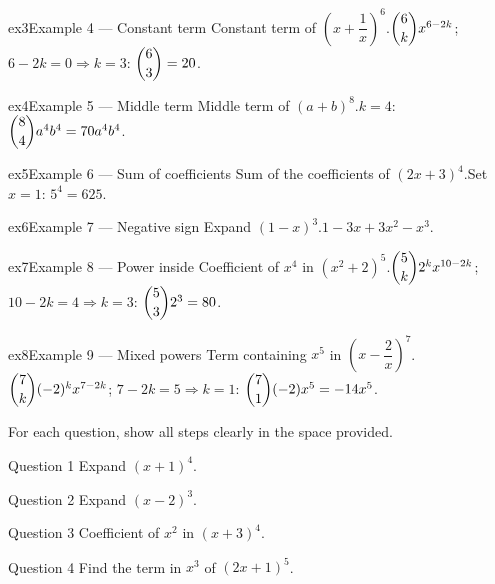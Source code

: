 \documentclass[11pt]{article}
\begin{document}
\begin{example}{ex3}{Example 4 --- Constant term}
Constant term of $\left(x+\dfrac1x\right)^6$.\soln $\dbinom{6}{k}x^{6-2k}$; $6-2k=0\Rightarrow k=3$: $\dbinom{6}{3}=20$.
\end{example}

\begin{example}{ex4}{Example 5 --- Middle term}
Middle term of $(a+b)^8$.\soln $k=4$: $\dbinom{8}{4}a^4b^4=70a^4b^4$.
\end{example}

\begin{example}{ex5}{Example 6 --- Sum of coefficients}
Sum of the coefficients of $(2x+3)^4$.\soln Set $x=1$: $5^4=625$.
\end{example}

\begin{example}{ex6}{Example 7 --- Negative sign}
Expand $(1-x)^3$.\soln $1-3x+3x^2-x^3$.
\end{example}

\begin{example}{ex7}{Example 8 --- Power inside}
Coefficient of $x^4$ in $(x^2+2)^5$.\soln $\dbinom{5}{k}2^{k}x^{10-2k}$; $10-2k=4\Rightarrow k=3$: $\dbinom{5}{3}2^3=80$.
\end{example}

\begin{example}{ex8}{Example 9 --- Mixed powers}
Term containing $x^5$ in $\left(x-\dfrac2x\right)^7$.\soln $\dbinom{7}{k}(-2)^{k}x^{7-2k}$; $7-2k=5\Rightarrow k=1$: $\dbinom{7}{1}(-2)x^5=-14x^5$.
\end{example}

\clearpage
{}
For each question, show all steps clearly in the space provided.

\begin{qbox}{Question 1}
Expand $(x+1)^4$.\workspace{2.4cm}
\end{qbox}

\begin{qbox}{Question 2}
Expand $(x-2)^3$.\workspace{2.4cm}
\end{qbox}

\begin{qbox}{Question 3}
Coefficient of $x^2$ in $(x+3)^4$.\workspace{2.4cm}
\end{qbox}

\begin{qbox}{Question 4}
Find the term in $x^3$ of $(2x+1)^5$.\workspace{2.4cm}
\end{qbox}
\end{document}
